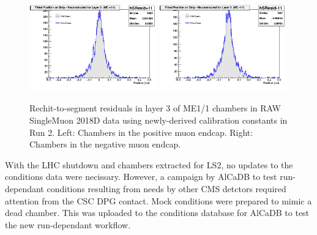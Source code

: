 \begin{figure}[H]
    \centering
    \includegraphics[width=0.49\textwidth]{Images/DetectorPerformance/CSCCalibStudy2019/ConstValidationPlots/hSResidplus11.png}
    \includegraphics[width=0.49\textwidth]{Images/DetectorPerformance/CSCCalibStudy2019/ConstValidationPlots/hSResidminus11.png}
    \caption{Rechit-to-segment residuals in layer 3 of ME1/1 chambers in RAW SingleMuon 2018D data using newly-derived calibration constants in Run 2. Left: Chambers in the positive muon endcap. Right: Chambers in the negative muon endcap.}
    \label{fig:CalibVal1}
\end{figure}

With the LHC shutdown and chambers extracted for LS2, no updates to the conditions data were necissary. However, a campaign by AlCaDB to test run-dependant conditions resulting from needs by other CMS detctors required attention from the CSC DPG contact. Mock conditions were prepared to mimic a dead chamber. This was uploaded to the conditions database for AlCaDB to test the new run-dependant workflow.


